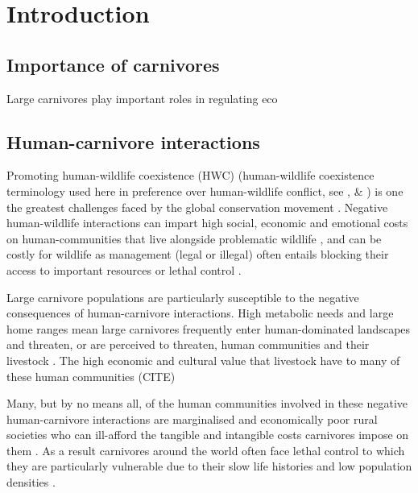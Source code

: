 \section{Introduction}

\subsection{Importance of carnivores}

Large carnivores play important roles in regulating eco

\subsection{Human-carnivore interactions}

Promoting human-wildlife coexistence (HWC) (human-wildlife coexistence terminology used here in preference over human-wildlife conflict, see \cite{MADDEN_2004}, \citet{Peterson_2010} \& \citet{Redpath_2014}) is one the greatest challenges faced by the global conservation movement \cite{Dickman_2010,Redpath2014}. Negative human-wildlife interactions can impart high social, economic and emotional costs on human-communities that live alongside problematic wildlife \cite{Barua_2013,Gogoi_2018}, and can be costly for wildlife as management (legal or illegal) often entails blocking their access to important resources or lethal control \cite{Treves,Baruch_Mordo_2013,Dickman_2010}.

Large carnivore populations are particularly susceptible to the negative consequences of human-carnivore interactions. High metabolic needs \cite{carbone1999energetic} and large home ranges \cite{Ripple_2014} mean large carnivores frequently enter human-dominated landscapes and threaten, or are perceived to threaten, human communities and their livestock \cite{Ripple_2014,Dickman_2014}. The high economic and cultural value that livestock have to many of these human communities (CITE)


Many, but by no means all, of the human communities involved in these negative human-carnivore interactions are marginalised and economically poor rural societies who can ill-afford the tangible and intangible costs carnivores impose on them \cite{Dickman_2014,Ripple_2014,Kansky_2014}. As a result carnivores around the world often face lethal control \cite{Thirgood2005} to which they are particularly vulnerable due to their slow life histories and low population densities \citep{woodroffe2005,Bodmer_1997,Cardillo_2004}.

